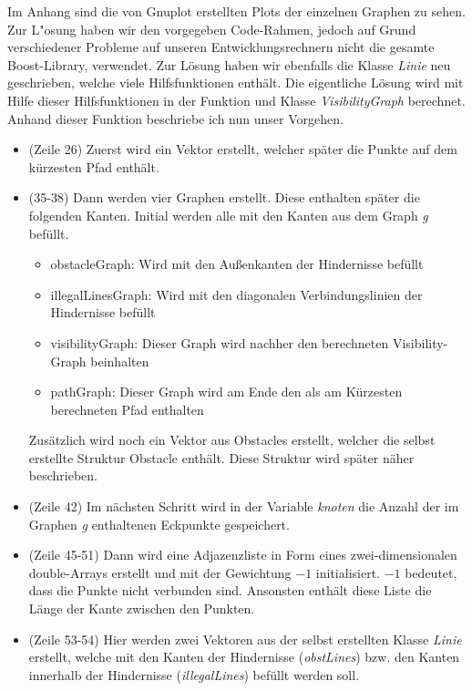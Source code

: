 \documentclass[a4paper]{scrartcl}
\begin{document}
Im Anhang sind die von Gnuplot erstellten Plots der einzelnen Graphen zu sehen.\\

Zur L"osung haben wir den vorgegeben Code-Rahmen, jedoch auf Grund verschiedener Probleme auf unseren Entwicklungsrechnern nicht die gesamte Boost-Library, verwendet. Zur Lösung haben wir ebenfalls die Klasse \textit{Linie} neu geschrieben, welche viele Hilfsfunktionen enthält. Die eigentliche Lösung wird mit Hilfe dieser Hilfsfunktionen in der Funktion und Klasse \textit{VisibilityGraph} berechnet. Anhand dieser Funktion beschriebe ich nun unser Vorgehen.

\begin{itemize}
	\item (Zeile 26) Zuerst wird ein Vektor erstellt, welcher später die Punkte auf dem kürzesten Pfad enthält.
	\item (35-38) Dann werden vier Graphen erstellt. Diese enthalten später die folgenden Kanten. Initial werden alle mit den Kanten aus dem Graph \textit{g} befüllt.
	\begin{itemize}
		\item obstacleGraph: Wird mit den Außenkanten der Hindernisse befüllt
		\item illegalLinesGraph: Wird mit den diagonalen Verbindungslinien der Hindernisse befüllt
		\item visibilityGraph: Dieser Graph wird nachher den berechneten Visibility-Graph beinhalten
		\item pathGraph: Dieser Graph wird am Ende den als am Kürzesten berechneten Pfad enthalten
	\end{itemize}
	Zusätzlich wird noch ein Vektor aus Obstacles erstellt, welcher die selbst erstellte Struktur Obstacle enthält. Diese Struktur wird später näher beschrieben.
	\item (Zeile 42) Im nächsten Schritt wird in der Variable \textit{knoten} die Anzahl der im Graphen \textit{g} enthaltenen Eckpunkte gespeichert.
	\item (Zeile 45-51) Dann wird eine Adjazenzliste in Form eines zwei-dimensionalen double-Arrays erstellt und mit der Gewichtung $-1$ initialisiert. $-1$ bedeutet, dass die Punkte nicht verbunden sind. Ansonsten enthält diese Liste die Länge der Kante zwischen den Punkten.
	\item (Zeile 53-54) Hier werden zwei Vektoren aus der selbst erstellten Klasse \textit{Linie} erstellt, welche mit den Kanten der Hindernisse (\textit{obstLines}) bzw. den Kanten innerhalb der Hindernisse (\textit{illegalLines}) befüllt werden soll.

\end{itemize}
\end{document}
